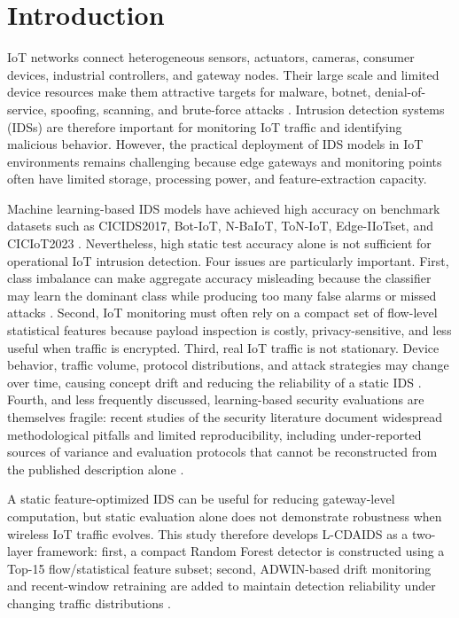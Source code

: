 \documentclass[11pt,a4paper]{article}
\begin{document}
\section{Introduction}
\label{sec:intro}

IoT networks connect heterogeneous sensors, actuators, cameras, consumer
devices, industrial controllers, and gateway nodes. Their large scale
and limited device resources make them attractive targets for malware,
botnet, denial-of-service, spoofing, scanning, and brute-force attacks
\cite{alfuqaha2015,antonakakis2017}. Intrusion detection systems (IDSs)
are therefore important for monitoring IoT traffic and identifying
malicious behavior. However, the practical deployment of IDS models in
IoT environments remains challenging because edge gateways and
monitoring points often have limited storage, processing power, and
feature-extraction capacity.

Machine learning-based IDS models have achieved high accuracy on
benchmark datasets such as CICIDS2017, Bot-IoT, N-BaIoT, ToN-IoT,
Edge-IIoTset, and CICIoT2023
\cite{sharafaldin2018,koroniotis2019,meidan2018,moustafa2021,ferrag2022,neto2023}.
Nevertheless, high static test accuracy alone is not sufficient for
operational IoT intrusion detection. Four issues are particularly
important. First, class imbalance can make aggregate accuracy misleading
because the classifier may learn the dominant class while producing too
many false alarms or missed attacks \cite{chawla2002,zoghi2021}. Second,
IoT monitoring must often rely on a compact set of flow-level
statistical features because payload inspection is costly,
privacy-sensitive, and less useful when traffic is encrypted. Third,
real IoT traffic is not stationary. Device behavior, traffic volume,
protocol distributions, and attack strategies may change over time,
causing concept drift and reducing the reliability of a static IDS
\cite{gama2014}. Fourth, and less frequently discussed, learning-based
security evaluations are themselves fragile: recent studies of the
security literature document widespread methodological pitfalls and
limited reproducibility, including under-reported sources of variance
and evaluation protocols that cannot be reconstructed from the published
description alone \cite{arp2024,olszewski2023,kapoor2023}.

A static feature-optimized IDS can be useful for reducing gateway-level
computation, but static evaluation alone does not demonstrate robustness
when wireless IoT traffic evolves. This study therefore develops
L-CDAIDS as a two-layer framework: first, a compact Random Forest
detector is constructed using a Top-15 flow/statistical feature subset;
second, ADWIN-based drift monitoring and recent-window retraining are
added to maintain detection reliability under changing traffic
distributions \cite{bifet2007}.
\end{document}
